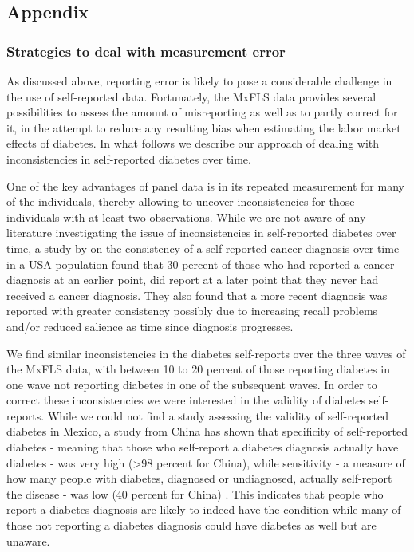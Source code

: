 \documentclass[12pt,english,british]{article}
\begin{document}
\begin{appendix}
\clearpage


\part*{\label{part:Appendix}Appendix}

\section{\label{sec:Appendix}Strategies to deal with measurement error}

As discussed above, reporting error is likely to pose a considerable
challenge in the use of self-reported data. Fortunately, the \ac{MxFLS}
data provides several possibilities to assess the amount of misreporting
as well as to partly correct for it, in the attempt to reduce any resulting
bias when estimating the labor market effects of diabetes. In what
follows we describe our approach of dealing with inconsistencies in
self-reported diabetes over time.

One of the key advantages of panel data is in its repeated measurement
for many of the individuals, thereby allowing to uncover inconsistencies
for those individuals with at least two observations. While we are
not aware of any literature investigating the issue of inconsistencies
in self-reported diabetes over time, a study by \citet{Zajacova2010}
on the consistency of a self-reported cancer diagnosis over time in
a USA population found that 30 percent of those who had reported a
cancer diagnosis at an earlier point, did report at a later point
that they never had received a cancer diagnosis. They also found that
a more recent diagnosis was reported with greater consistency possibly
due to increasing recall problems and/or reduced salience as time
since diagnosis progresses.

We find similar inconsistencies in the diabetes self-reports over
the three waves of the \ac{MxFLS} data, with between 10 to 20 percent
of those reporting diabetes in one wave not reporting diabetes in
one of the subsequent waves. In order to correct these inconsistencies we were interested in the validity of diabetes self-reports. While we could not find a study assessing
the validity of self-reported diabetes in Mexico, a study from China
has shown that specificity of self-reported diabetes - meaning that
those who self-report a diabetes diagnosis actually have diabetes
- was very high (>98 percent for China), while sensitivity - a measure
of how many people with diabetes, diagnosed or undiagnosed, actually
self-report the disease - was low (40 percent for China) \citep{Yuan2015}.
This indicates that people who report a diabetes diagnosis are likely
to indeed have the condition while many of those not reporting
a diabetes diagnosis could have diabetes as well but are unaware.


\end{appendix}
\end{document}
